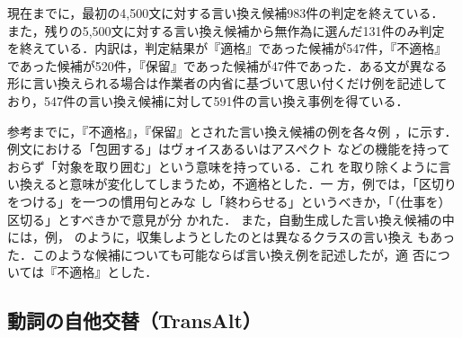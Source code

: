 現在までに，最初の4,500文に対する言い換え候補983件の判定を終えている．
また，残りの5,500文に対する言い換え候補から無作為に選んだ131件のみ判定
を終えている．内訳は，判定結果が『適格』であった候補が547件，『不適格』
であった候補が520件，『保留』であった候補が47件であった．ある文が異なる
形に言い換えられる場合は作業者の内省に基づいて思い付くだけ例を記述して
おり，547件の言い換え候補に対して591件の言い換え事例を得ている．

参考までに，『不適格』，『保留』とされた言い換え候補の例を各々例
，に示す．
例文における「包囲する」はヴォイスあるいはアスペクト
などの機能を持っておらず「対象を取り囲む」という意味を持っている．これ
を取り除くように言い換えると意味が変化してしまうため，不適格とした．一
方，例では，「区切りをつける」を一つの慣用句とみな
し「終わらせる」というべきか，「（仕事を）区切る」とすべきかで意見が分
かれた．
また，自動生成した言い換え候補の中には，例，
 のように，収集しようとしたのとは異なるクラスの言い換え
もあった．このような候補についても可能ならば言い換え例を記述したが，適
否については『不適格』とした．

\subsection{動詞の自他交替（TransAlt）}
\label{ssec:transalt}


